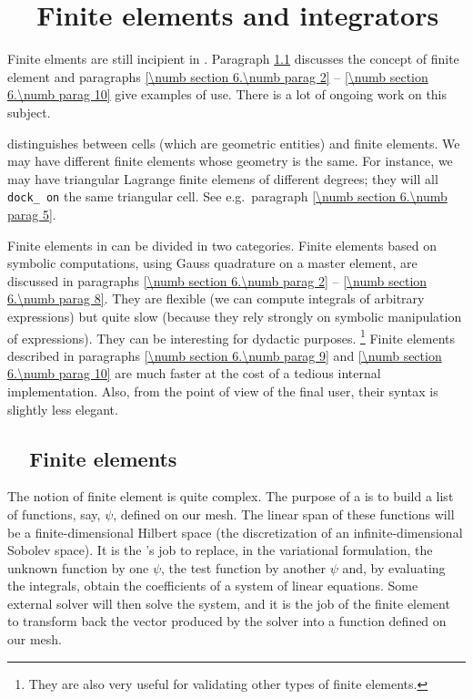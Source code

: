 
\chapter{~~Finite elements and integrators}\label{\numb section 6}


Finite elments are still incipient in \maniFEM.
Paragraph \ref{\numb section 6.\numb parag 1} discusses the concept of finite element
and paragraphs \ref{\numb section 6.\numb parag 2} -- \ref{\numb section 6.\numb parag 10}
give examples of use.
There is a lot of ongoing work on this subject.

{\ManiFEM} distinguishes between cells (which are geometric entities) and finite elements.
We may have different finite elements whose geometry is the same.
For instance, we may have triangular Lagrange finite elemens of different degrees;
they will all {\small\tt dock\_\,on} the same triangular cell.
See e.g.\ paragraph \ref{\numb section 6.\numb parag 5}.

Finite elements in {\maniFEM} can be divided in two categories.
Finite elements based on symbolic computations, using Gauss quadrature on a master element,
are discussed in
paragraphs \ref{\numb section 6.\numb parag 2} -- \ref{\numb section 6.\numb parag 8}.
They are flexible (we can compute integrals of arbitrary expressions) but quite slow
(because they rely strongly on symbolic manipulation of expressions).
They can be interesting for dydactic purposes.%
\footnote{They are also very useful for validating other types of finite elements.}
Finite elements described in paragraphs \ref{\numb section 6.\numb parag 9} and
\ref{\numb section 6.\numb parag 10} are much faster at the cost of a tedious internal
implementation.
Also, from the point of view of the final user, their syntax is slightly less elegant.


\section{~~Finite elements}\label{\numb section 6.\numb parag 1}

The notion of finite element is quite complex.
The purpose of a {\small\tt{}} is to build a list of functions, say, $ \psi $,
defined on our mesh.
The linear span of these functions will be a finite-dimensional Hilbert space
(the discretization of an infinite-dimensional Sobolev space).
It is the {\small\tt{}}'s job to replace, in the variational formulation,
the unknown function by one $ \psi $, the test function by another $ \psi $ and,
by evaluating the integrals, obtain the coefficients of a system of linear equations.
Some external solver will then solve the system, and it is the job of the finite element
to transform back the vector produced by the solver into a function defined on our mesh.

